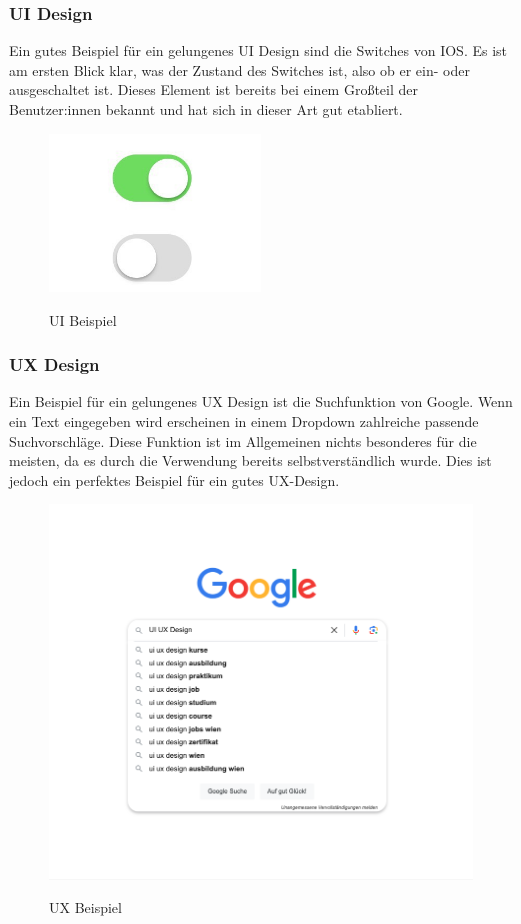 \subsubsection{UI Design}
Ein gutes Beispiel für ein gelungenes UI Design sind die Switches von IOS. Es ist am ersten Blick klar, was der Zustand des Switches ist, also ob er ein- oder ausgeschaltet ist. Dieses Element ist bereits bei einem Großteil der Benutzer:innen bekannt und hat sich in dieser Art gut etabliert.

\cite{frontend_ui_ux}

\begin{figure}[h!]
    \centering
    \includegraphics[width=0.5\textwidth]{pics/ui-example.png}
    \caption{UI Beispiel}
    \cite{frontend_ui_ux}
    \label{fig:mesh1}
\end{figure}
\newpage
\subsubsection{UX Design}
Ein Beispiel für ein gelungenes UX Design ist die Suchfunktion von Google. Wenn ein Text eingegeben wird erscheinen in einem Dropdown zahlreiche passende Suchvorschläge. Diese Funktion ist im Allgemeinen nichts besonderes für die meisten, da es durch die Verwendung bereits selbstverständlich wurde. Dies ist jedoch ein perfektes Beispiel für ein gutes UX-Design.

\cite{frontend_ui_ux}

\begin{figure}[h!]
    \centering
    \includegraphics[width=1\textwidth]{pics/ux-example.png}
    \caption{UX Beispiel}
    \cite{frontend_ui_ux}
    \label{fig:mesh1}
\end{figure}
